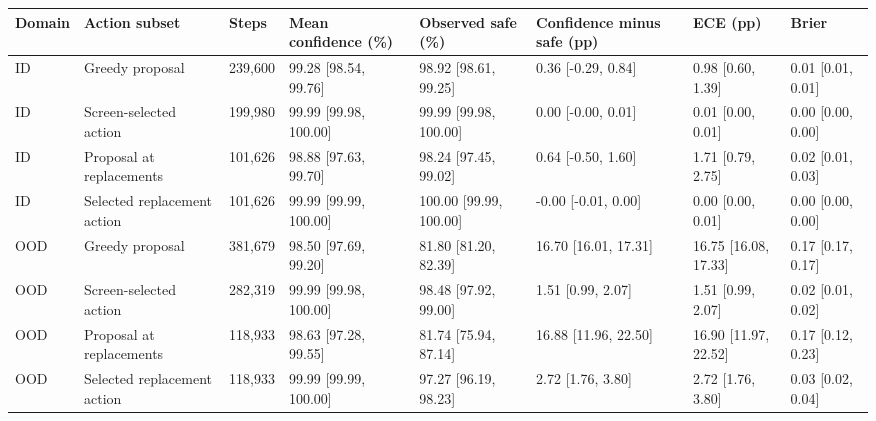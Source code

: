 \begin{tabular}{llllllll}
\toprule
Domain & Action subset & Steps & Mean confidence (\%) & Observed safe (\%) & Confidence minus safe (pp) & ECE (pp) & Brier \\
\midrule
ID & Greedy proposal & 239,600 & 99.28 [98.54, 99.76] & 98.92 [98.61, 99.25] & 0.36 [-0.29, 0.84] & 0.98 [0.60, 1.39] & 0.01 [0.01, 0.01] \\
ID & Screen-selected action & 199,980 & 99.99 [99.98, 100.00] & 99.99 [99.98, 100.00] & 0.00 [-0.00, 0.01] & 0.01 [0.00, 0.01] & 0.00 [0.00, 0.00] \\
ID & Proposal at replacements & 101,626 & 98.88 [97.63, 99.70] & 98.24 [97.45, 99.02] & 0.64 [-0.50, 1.60] & 1.71 [0.79, 2.75] & 0.02 [0.01, 0.03] \\
ID & Selected replacement action & 101,626 & 99.99 [99.99, 100.00] & 100.00 [99.99, 100.00] & -0.00 [-0.01, 0.00] & 0.00 [0.00, 0.01] & 0.00 [0.00, 0.00] \\
OOD & Greedy proposal & 381,679 & 98.50 [97.69, 99.20] & 81.80 [81.20, 82.39] & 16.70 [16.01, 17.31] & 16.75 [16.08, 17.33] & 0.17 [0.17, 0.17] \\
OOD & Screen-selected action & 282,319 & 99.99 [99.98, 100.00] & 98.48 [97.92, 99.00] & 1.51 [0.99, 2.07] & 1.51 [0.99, 2.07] & 0.02 [0.01, 0.02] \\
OOD & Proposal at replacements & 118,933 & 98.63 [97.28, 99.55] & 81.74 [75.94, 87.14] & 16.88 [11.96, 22.50] & 16.90 [11.97, 22.52] & 0.17 [0.12, 0.23] \\
OOD & Selected replacement action & 118,933 & 99.99 [99.99, 100.00] & 97.27 [96.19, 98.23] & 2.72 [1.76, 3.80] & 2.72 [1.76, 3.80] & 0.03 [0.02, 0.04] \\
\bottomrule
\end{tabular}
